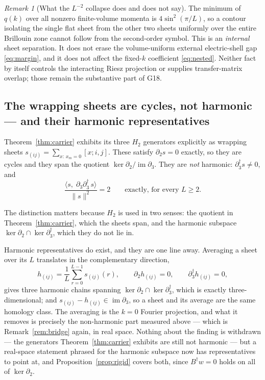 \documentclass[11pt]{article}
\theoremstyle{plain}
\theoremstyle{definition}
\theoremstyle{remark}
\newtheorem{remark}[theorem]{Remark}
\newcommand{\chk}[1]{}
\newcommand{\dg}{^{\dagger}}
\begin{document}
\begin{remark}[What the $L^{-2}$ collapse does and does not say]\label{rem:collapse}
The minimum of $q(k)$ over all nonzero finite-volume momenta is
$4\sin^2(\pi/L)$, so a contour isolating the single flat sheet from the other
two sheets uniformly over the entire Brillouin zone cannot follow from the
second-order symbol. This is an \emph{internal} sheet separation. It does not
erase the volume-uniform external electric-shell gap \eqref{eq:margin}, and it
does not affect the fixed-$k$ coefficient \eqref{eq:nested}. Neither fact by
itself controls the interacting Riesz projection or supplies transfer-matrix
overlap; those remain the substantive part of G18.
\end{remark}

\subsection{The wrapping sheets are cycles, not harmonic --- and their
harmonic representatives}

Theorem~\ref{thm:carrier} exhibits its three $H_2$ generators explicitly as
wrapping sheets $s_{(ij)}=\sum_{x:\,x_m=0}[x;i,j]$. These satisfy
$\partial_2 s=0$ exactly, so they are cycles and they span the quotient
$\ker\partial_2/\operatorname{im}\partial_3$. They are \emph{not} harmonic:
$\partial_3\dg s\neq0$, and
\begin{equation}
  \frac{\langle s,\;\partial_3\partial_3\dg\,s\rangle}{\|s\|^2}=2
  \qquad\text{exactly, for every }L\ge2 .
\end{equation}
\chk{FINDING: the wrapping sheets are cycles but NOT harmonic}

The distinction matters because $H_2$ is used in two senses: the quotient in
Theorem~\ref{thm:carrier}, which the sheets span, and the harmonic subspace
$\ker\partial_2\cap\ker\partial_3\dg$, which they do not lie in.

Harmonic representatives do exist, and they are one line away. Averaging a
sheet over its $L$ translates in the complementary direction,
\begin{equation}\label{eq:harmavg}
  h_{(ij)}=\frac1L\sum_{r=0}^{L-1}s_{(ij)}(r),\qquad
  \partial_2h_{(ij)}=0,\qquad \partial_3\dg h_{(ij)}=0,
\end{equation}
gives three harmonic chains spanning
$\ker\partial_2\cap\ker\partial_3\dg$, which is exactly three-dimensional; and
$s_{(ij)}-h_{(ij)}\in\operatorname{im}\partial_3$, so a sheet and its average
are the same homology class. The averaging is the $k=0$ Fourier projection,
and what it removes is precisely the non-harmonic part measured above ---
which is Remark~\ref{rem:bridge} again, in real space. Nothing about the
finding is withdrawn --- the generators Theorem~\ref{thm:carrier} exhibits are
still not harmonic --- but a real-space statement phrased for the harmonic
subspace now has representatives to point at, and
Proposition~\ref{prop:rigid} covers both, since $B\dg w=0$ holds on all of
$\ker\partial_2$.
\chk{the sheets average to harmonic representatives, and the Gamma block IS b\_2}
\end{document}
